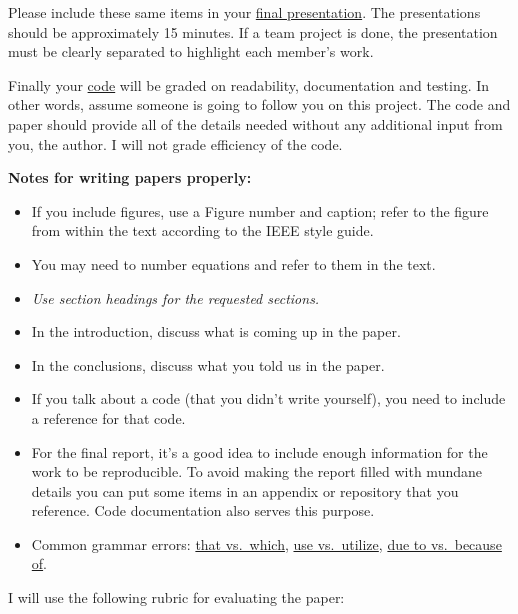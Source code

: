 \documentclass[a4paper, 12 pt]{curve}
\begin{document}
\vspace*{2em}
Please include these same items in your \underline{final presentation}. The presentations should be approximately 15 minutes. If a team project is done, the presentation must be clearly separated to highlight each member's work. 

\vspace*{2em}
Finally your \underline{code} will be graded on readability, documentation and testing. In other words, assume someone is going to follow you on this project.  The code and paper should provide all of the details needed without any additional input from you, the author. I will not grade efficiency of the code.

\vspace*{2em}
\textbf{Notes for writing papers properly:}
\begin{itemize}
\item If you include figures, use a Figure number and caption; refer to the figure from within the text according to the IEEE style guide.
\item You may need to number equations and refer to them in the text.
\item \textit{Use section headings for the requested sections.}
\item In the introduction, discuss what is coming up in the paper. 
\item In the conclusions, discuss what you told us in the paper.
\item If you talk about a code (that you didn't write yourself), you need to include a reference for that code. 
\item For the final report, it's a good idea to include enough information for the work to be reproducible. To avoid making the report filled with mundane details you can put some items in an appendix or repository that you reference.  Code documentation also serves this purpose.
\item Common grammar errors: \href{http://www.quickanddirtytips.com/education/grammar/which-versus-that-0}{that vs.\ which}, \href{http://grammarpartyblog.com/2012/01/17/use-versus-utilize/}{use vs.\ utilize}, \href{https://e-gmat.com/blog/gmat-verbal/sentence-correction/idioms/due-to-vs-because-of}{due to vs.\ because of}.
\end{itemize}

\vspace*{2em}
I will use the following rubric for evaluating the paper:
\end{document}
